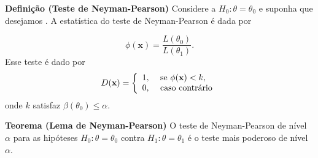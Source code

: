 \documentclass[
  letterpaper,
  DIV=11,
  numbers=noendperiod]{scrartcl}
\begin{document}
\textbf{Definição (Teste de Neyman-Pearson)} Considere a
\(H_0:\theta=\theta_0\) e suponha que desejamos . A estatística do teste
de Neyman-Pearson é dada por

\[\phi(\textbf{x})=\frac{L(\theta_0)}{L(\theta_1)}.\] Esse teste é dado
por
\[D(\textbf{x})=\left\{\begin{array}{ll}1,&\hbox{ se }\phi(\textbf{x})<k,\\
0,&\hbox{ caso contrário}\end{array}\right.\] onde \(k\) satisfaz
\(\beta(\theta_0)\leq \alpha.\)

\textbf{Teorema (Lema de Neyman-Pearson)} O teste de Neyman-Pearson de
nível \(\alpha\) para as hipóteses \(H_0:\theta=\theta_0\) contra
\(H_1:\theta=\theta_1\) é o teste mais poderoso de nível \(\alpha\).
\end{document}
